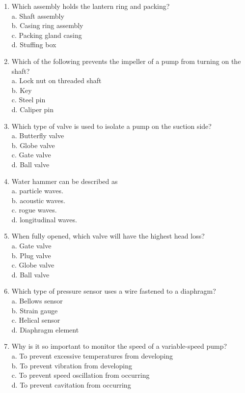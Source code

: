 \documentclass[10pt]{article}
\begin{document}
\begin{enumerate}
	\item Which assembly holds the lantern ring and packing?\\
a. Shaft assembly\\
b. Casing ring assembly\\
c. Packing gland casing\\
d. Stuffing box

  \item Which of the following prevents the impeller of a pump from turning on the shaft?\\
a. Lock nut on threaded shaft\\
b. Key\\
c. Steel pin\\
d. Caliper pin

  \item Which type of valve is used to isolate a pump on the suction side?\\
a. Butterfly valve\\
b. Globe valve\\
c. Gate valve\\
d. Ball valve

  \item Water hammer can be described as\\
a. particle waves.\\
b. acoustic waves.\\
c. rogue waves.\\
d. longitudinal waves.

  \item When fully opened, which valve will have the highest head loss?\\
a. Gate valve\\
b. Plug valve\\
c. Globe valve\\
d. Ball valve

  \item Which type of pressure sensor uses a wire fastened to a diaphragm?\\
a. Bellows sensor\\
b. Strain gauge\\
c. Helical sensor\\
d. Diaphragm element

  \item Why is it so important to monitor the speed of a variable-speed pump?\\
a. To prevent excessive temperatures from developing\\
b. To prevent vibration from developing\\
c. To prevent speed oscillation from occurring\\
d. To prevent cavitation from occurring


\end{enumerate}
\end{document}
